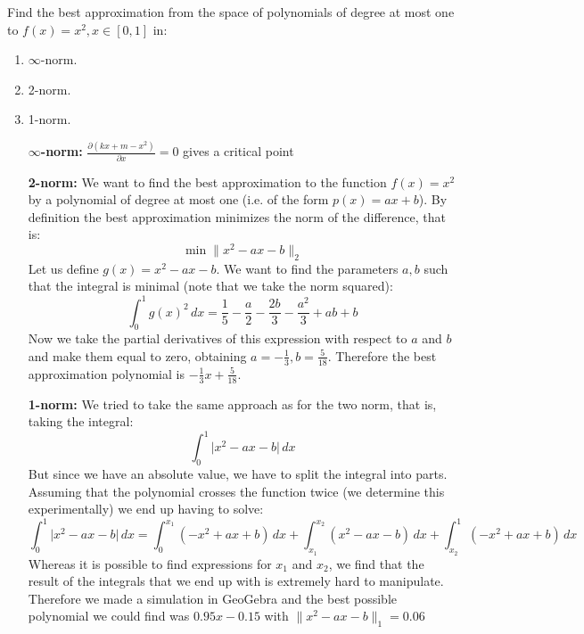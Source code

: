 \begin{problem}
Find the best approximation from the space of polynomials of degree at
most one to $f(x) = x^2 , x \in [0 , 1]$ in:
\begin{enumerate}
\item $\infty$-norm.
\item 2-norm.
\item 1-norm.
\end{enumerate}
\end{problem}

\begin{solution}
  \begin{enumerate}
<<<<<<< HEAD
  \item [{\bf $\infty$-norm: }]
    $\frac{\partial (kx + m - x^2)}{\partial x} = 0$ gives a critical
    point 

  \item[{\bf 2-norm: }]
  We want to find the best approximation to the function $f(x) = x^2$ by a polynomial of degree at most one (i.e. of the form $p(x) = ax+b$). By definition the best approximation minimizes the norm of the difference, that is:
  \begin{equation*}
  \min \lVert x^2-ax-b \rVert_2
  \end{equation*}
  Let us define $g(x) = x^2-ax-b$. We want to find the parameters $a, b$ such that the integral is minimal (note that we take the norm squared):
  \begin{equation*}
  \int_0^1 g(x)^2 \, dx = \frac{1}{5} - \frac{a}{2} - \frac{2b}{3} - \frac{a^2}{3} + ab+b
  \end{equation*}
  Now we take the partial derivatives of this expression with respect to $a$ and $b$ and make them equal to zero, obtaining $a = -\frac{1}{3}, b = \frac{5}{18}$. Therefore the best approximation polynomial is $-\frac{1}{3}x + \frac{5}{18}$.
    
  \item [{\bf 1-norm: }]
We tried to take the same approach as for the two norm, that is, taking the integral:
\begin{equation*}
\int_0^1 \lvert x^2-ax-b \rvert \, dx
\end{equation*}
But since we have an absolute value, we have to split the integral into parts. Assuming that the polynomial crosses the function twice (we determine this experimentally) we end up having to solve:
\begin{equation*}
\int_0^1 \lvert x^2-ax-b \rvert \, dx = \int_0^{x_1} (-x^2+ax+b) \, dx + \int_{x_1}^{x_2} (x^2-ax-b) \, dx+ \int_{x_2}^1 (-x^2+ax+b) \, dx
\end{equation*}
Whereas it is possible to find expressions for $x_1$ and $x_2$, we find that the result of the integrals that we end up with is extremely hard to manipulate. Therefore we made a simulation in GeoGebra and the best possible polynomial we could find was $0.95x-0.15$ with $\lVert x^2-ax-b \rVert_1 = 0.06$


\end{enumerate}
\end{solution}
